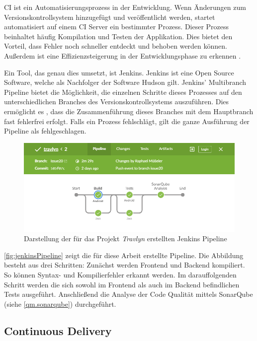 			\ac{CI} ist ein Automatisierungsprozess in der Entwicklung. Wenn Änderungen zum Versionskontrollsystem hinzugefügt und veröffentlicht werden, startet automatisiert auf einem \acs{CI} Server ein bestimmter Prozess. Dieser Prozess beinhaltet häufig Kompilation und Testen der Applikation. Dies bietet den Vorteil, dass Fehler noch schneller entdeckt und behoben werden können. Außerdem ist eine Effizienzsteigerung in der Entwicklungsphase zu erkennen \cite{Fowler.2292020}. 
			
			Ein Tool, das genau dies umsetzt, ist Jenkins. Jenkins ist eine Open Source Software, welche als Nachfolger der Software Hudson gilt. Jenkins' Multibranch Pipeline bietet die Möglichkeit, die einzelnen Schritte dieses Prozesses auf den unterschiedlichen Branches des Versionskontrollsystems auszuführen. Dies ermöglicht es \zB, dass die Zusammenführung dieses Branches mit dem Hauptbranch fast fehlerfrei erfolgt. Falls ein Prozess fehlschlägt, gilt die ganze Ausführung der Pipeline als fehlgeschlagen. \cite{CloudBees.322020}
			
			\begin{figure}[ht!]
				\centering
				\includegraphics[width=1\textwidth]{images/jenkins-pipeline.png}
				\caption{Darstellung der für das Projekt \textit{Travlyn} erstellten Jenkins Pipeline}
				\label{fig:jenkinsPipeline}
			\end{figure} 
		
			\autoref{fig:jenkinsPipeline} zeigt die für diese Arbeit erstellte Pipeline. Die Abbildung besteht aus drei Schritten: Zunächst werden Frontend und Backend kompiliert. So können Syntax- und Kompilierfehler erkannt werden. Im darauffolgenden Schritt werden die sich sowohl im Frontend als auch im Backend befindlichen Tests ausgeführt. Anschließend die Analyse der Code Qualität mittels SonarQube (siehe \autoref{qm.sonarqube}) durchgeführt. 
		
		\subsection{Continuous Delivery}
		
